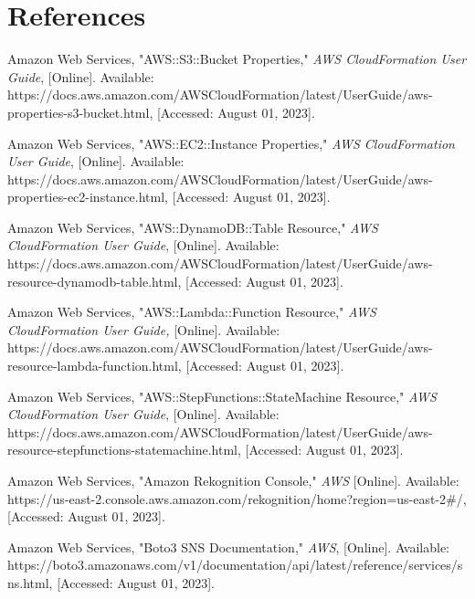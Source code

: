 
\section*{References}
\begin{sloppypar}

  \begin{enumerate}[label={[\arabic*]}]
  
    \item Amazon Web Services, "AWS::S3::Bucket Properties," \textit{AWS CloudFormation User Guide}, [Online]. Available: https://docs.aws.amazon.com/AWSCloudFormation/latest/UserGuide/aws-properties-s3-bucket.html, [Accessed: August 01, 2023].

    \item Amazon Web Services, "AWS::EC2::Instance Properties," \textit{AWS CloudFormation User Guide}, [Online]. Available: https://docs.aws.amazon.com/AWSCloudFormation/latest/UserGuide/aws-properties-ec2-instance.html, [Accessed: August 01, 2023].

    \item Amazon Web Services, "AWS::DynamoDB::Table Resource," \textit{AWS CloudFormation User Guide}, [Online]. Available: https://docs.aws.amazon.com/AWSCloudFormation/latest/UserGuide/aws-resource-dynamodb-table.html, [Accessed: August 01, 2023].

    \item Amazon Web Services, "AWS::Lambda::Function Resource," \textit{AWS CloudFormation User Guide,} [Online]. Available: https://docs.aws.amazon.com/AWSCloudFormation/latest/UserGuide/aws-resource-lambda-function.html, [Accessed: August 01, 2023].

    \item Amazon Web Services, "AWS::StepFunctions::StateMachine Resource,"\textit{ AWS CloudFormation User Guide}, [Online]. Available: https://docs.aws.amazon.com/AWSCloudFormation/latest/UserGuide/aws-resource-stepfunctions-statemachine.html, [Accessed: August 01, 2023].

    \item Amazon Web Services, "Amazon Rekognition Console," \textit{AWS} [Online]. Available: https://us-east-2.console.aws.amazon.com/rekognition/home?region=us-east-2\#/, [Accessed: August 01, 2023].

    \item Amazon Web Services, "Boto3 SNS Documentation," \textit{AWS}, [Online]. Available: https://boto3.amazonaws.com/v1/documentation/api/latest/reference/services/sns.html, [Accessed: August 01, 2023].


\end{enumerate}
\end{sloppypar}

